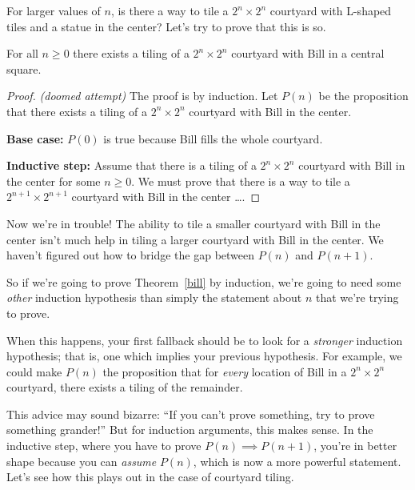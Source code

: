 For larger values of $n$, is there a way to tile a $2^n \times 2^n$
courtyard with L-shaped tiles and a statue in the center?  Let's try to
prove that this is so.

\begin{theorem}\label{bill}
For all $n \geq 0$ there exists a tiling of a $2^n \times 2^n$
courtyard with Bill in a central square.
\end{theorem}

\begin{proof}
{\em (doomed attempt)} The proof is by induction.  Let $P(n)$ be the
proposition that there exists a tiling of a $2^n \times 2^n$ courtyard
with Bill in the center.

\textbf{Base case:} $P(0)$ is true because Bill fills the whole courtyard.

\textbf{Inductive step:} Assume that there is a tiling of a
$2^n \times 2^n$ courtyard with Bill in the center for some $n \geq
0$.  We must prove that there is a way to tile a $2^{n+1} \times
2^{n+1}$ courtyard with Bill in the center \dots.
\end{proof}

Now we're in trouble!  The ability to tile a smaller courtyard with Bill
in the center isn't much help in tiling a larger courtyard with Bill in
the center.  We haven't figured out how to bridge the gap between $P(n)$
and $P(n+1)$.

So if we're going to prove Theorem~\ref{bill} by induction, we're going to
need some \emph{other} induction hypothesis than simply the statement
about $n$ that we're trying to prove.





When this happens, your first fallback should be to look for a
\textit{stronger} induction hypothesis; that is, one which implies
your previous hypothesis.  For example, we could make $P(n)$ the
proposition that for \textit{every} location of Bill in a $2^n \times
2^n$ courtyard, there exists a tiling of the remainder.

This advice may sound bizarre: ``If you can't prove something, try to
prove something grander!''  But for induction arguments, this makes sense.
In the inductive step, where you have to prove $P(n) \implies P(n+1)$,
you're in better shape because you can {\em assume} $P(n)$, which is now a
more powerful statement.  Let's see how this plays out in the case of
courtyard tiling.

